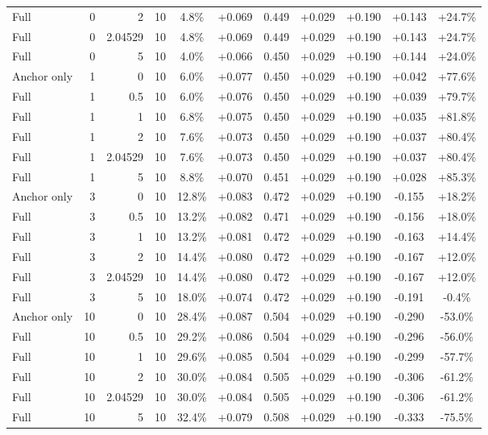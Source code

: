 \begin{table}[htbp]
\begin{tabular}{lrrrccccccc}
Full & 0 & 2 & 10 & 4.8\% & +0.069 & 0.449 & +0.029 & +0.190 & +0.143 & +24.7\% \\
Full & 0 & 2.04529 & 10 & 4.8\% & +0.069 & 0.449 & +0.029 & +0.190 & +0.143 & +24.7\% \\
Full & 0 & 5 & 10 & 4.0\% & +0.066 & 0.450 & +0.029 & +0.190 & +0.144 & +24.0\% \\
Anchor only & 1 & 0 & 10 & 6.0\% & +0.077 & 0.450 & +0.029 & +0.190 & +0.042 & +77.6\% \\
Full & 1 & 0.5 & 10 & 6.0\% & +0.076 & 0.450 & +0.029 & +0.190 & +0.039 & +79.7\% \\
Full & 1 & 1 & 10 & 6.8\% & +0.075 & 0.450 & +0.029 & +0.190 & +0.035 & +81.8\% \\
Full & 1 & 2 & 10 & 7.6\% & +0.073 & 0.450 & +0.029 & +0.190 & +0.037 & +80.4\% \\
Full & 1 & 2.04529 & 10 & 7.6\% & +0.073 & 0.450 & +0.029 & +0.190 & +0.037 & +80.4\% \\
Full & 1 & 5 & 10 & 8.8\% & +0.070 & 0.451 & +0.029 & +0.190 & +0.028 & +85.3\% \\
Anchor only & 3 & 0 & 10 & 12.8\% & +0.083 & 0.472 & +0.029 & +0.190 & -0.155 & +18.2\% \\
Full & 3 & 0.5 & 10 & 13.2\% & +0.082 & 0.471 & +0.029 & +0.190 & -0.156 & +18.0\% \\
Full & 3 & 1 & 10 & 13.2\% & +0.081 & 0.472 & +0.029 & +0.190 & -0.163 & +14.4\% \\
Full & 3 & 2 & 10 & 14.4\% & +0.080 & 0.472 & +0.029 & +0.190 & -0.167 & +12.0\% \\
Full & 3 & 2.04529 & 10 & 14.4\% & +0.080 & 0.472 & +0.029 & +0.190 & -0.167 & +12.0\% \\
Full & 3 & 5 & 10 & 18.0\% & +0.074 & 0.472 & +0.029 & +0.190 & -0.191 & -0.4\% \\
Anchor only & 10 & 0 & 10 & 28.4\% & +0.087 & 0.504 & +0.029 & +0.190 & -0.290 & -53.0\% \\
Full & 10 & 0.5 & 10 & 29.2\% & +0.086 & 0.504 & +0.029 & +0.190 & -0.296 & -56.0\% \\
Full & 10 & 1 & 10 & 29.6\% & +0.085 & 0.504 & +0.029 & +0.190 & -0.299 & -57.7\% \\
Full & 10 & 2 & 10 & 30.0\% & +0.084 & 0.505 & +0.029 & +0.190 & -0.306 & -61.2\% \\
Full & 10 & 2.04529 & 10 & 30.0\% & +0.084 & 0.505 & +0.029 & +0.190 & -0.306 & -61.2\% \\
Full & 10 & 5 & 10 & 32.4\% & +0.079 & 0.508 & +0.029 & +0.190 & -0.333 & -75.5\% \\

\end{tabular}
\end{table}
